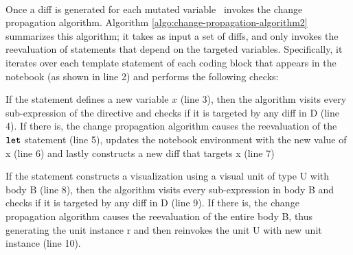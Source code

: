 \\
Once a diff is generated for each mutated variable \projname\ invokes the change propagation algorithm. Algorithm \ref{algo:change-propagation-algorithm2} summarizes this algorithm; it takes as input a set of diffs, and only invokes the reevaluation of statements that depend on the targeted variables. Specifically, it iterates over each template statement of each coding block that appears in the notebook (as shown in line 2) and performs the following checks:

\begin{compactitem}

\item If the statement defines a new variable $x$ (line 3), then the algorithm visits every sub-expression of the  directive and checks if it is targeted by any diff in D (line 4). If there is, the change propagation algorithm causes the reevaluation of the $\texttt{\textbf{let}}$ statement (line 5), updates the notebook environment with the new value of x (line 6) and lastly constructs a new diff that targets x (line 7)

\item If the statement constructs a visualization using a visual unit of type U with body B (line 8), then the algorithm visits every sub-expression in body B and checks if it is targeted by any diff in D (line 9). If there is, the change propagation algorithm causes the reevaluation of the entire body B, thus generating the unit instance r and then reinvokes the unit U with new unit instance (line 10).



\end{compactitem}

